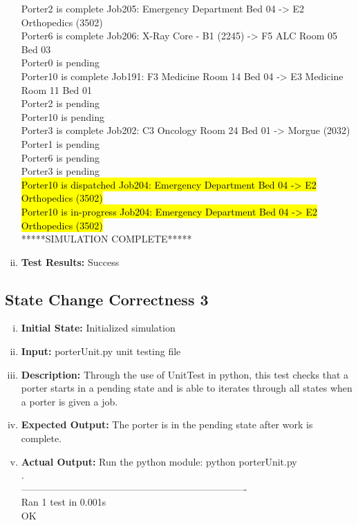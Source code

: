 \documentclass[paper=letter, fontsize=10pt]{scrartcl}
\numberwithin{equation}{section}		%
\numberwithin{figure}{section}			%
\numberwithin{table}{section}				%
\begin{document}
\begin{enumerate}[(i)]
Porter2 is complete Job205: Emergency Department Bed 04 -> E2 Orthopedics (3502)\\
Porter6 is complete Job206: X-Ray Core - B1 (2245) -> F5 ALC Room 05 Bed 03\\
Porter0 is pending\\
Porter10 is complete Job191: F3 Medicine Room 14 Bed 04 -> E3 Medicine Room 11 Bed 01\\
Porter2 is pending\\
Porter10 is pending\\
Porter3 is complete Job202: C3 Oncology Room 24 Bed 01 -> Morgue (2032)\\
Porter1 is pending\\
Porter6 is pending\\
Porter3 is pending\\
\hl{Porter10 is dispatched Job204: Emergency Department Bed 04 -> E2 Orthopedics (3502)}\\
\hl{Porter10 is in-progress Job204: Emergency Department Bed 04 -> E2 Orthopedics (3502)}\\
*****SIMULATION COMPLETE*****\\

	\item \textbf{Test Results:} Success
\end{enumerate}

\subsection{State Change Correctness 3}
\begin{enumerate}[(i)]
		\item \textbf{Initial State:} Initialized simulation
		\item \textbf{Input:} porterUnit.py unit testing file
		\item \textbf{Description:} Through the use of UnitTest in python, this test checks that a porter starts in a pending state and is able to iterates through all states when a porter is given a job.
		\item \textbf{Expected Output:} The porter is in the pending state after work is complete.
		\item \textbf{Actual Output:} Run the python module: python porterUnit.py\\
.\\
----------------------------------------------------------------------\\
Ran 1 test in 0.001s\\

OK
\end{enumerate}
\end{document}
